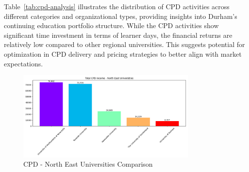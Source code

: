 \documentclass[journal,onecolumn, 10pt,draftclsnofoot]{IEEEtran}
\begin{document}
Table~\ref{tab:cpd-analysis} illustrates the distribution of CPD activities across different categories and organizational types, providing insights into Durham's continuing education portfolio structure. While the CPD activities show significant time investment in terms of learner days, the financial returns are relatively low compared to other regional universities. This suggests potential for optimization in CPD delivery and pricing strategies to better align with market expectations.
\vspace{0.25cm}
\begin{table}[h]
\centering
\caption{CPD and Continuing Education Analysis - Durham University}
\vspace{0.1cm}
\label{tab:cpd-analysis}
\end{table}

\begin{figure}[h]
\centering
\includegraphics[width=0.8\textwidth]{Fig/figure13.cpd_ne_comparison.png}
\caption{CPD - North East Universities Comparison}
\label{fig:cpd-ne-comparison}
\end{figure}
\end{document}
